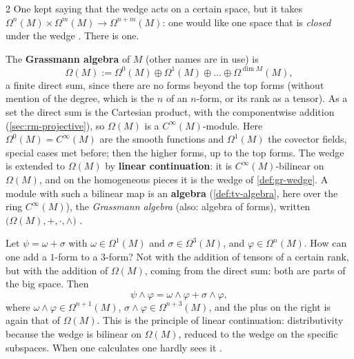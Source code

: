 \begin{paracol}{2}
One kept saying that the wedge acts on a certain space, but it takes $\Omega^n(M)\times\Omega^m(M)\to\Omega^{n+m}(M)$: one would like one space that is \emph{closed} under the wedge  . There is one.
\begin{definition}\label{def:gr-grassmann}
The \textbf{Grassmann algebra} of $M$ (other names are in use) is
\[
  \Omega(M):=\Omega^0(M)\oplus\Omega^1(M)\oplus\dots\oplus\Omega^{\dim M}(M),
\]
a finite direct sum, since there are no forms beyond the top forms (without mention of the degree, which is the $n$ of an $n$-form, or its rank as a tensor). As a set the direct sum is the Cartesian product, with the componentwise addition (\cref{sec:rm-projective}), so $\Omega(M)$ is a $C^\infty(M)$-module. Here $\Omega^0(M)=C^\infty(M)$ are the
smooth functions and $\Omega^1(M)$ the covector fields, special cases met before; then the higher forms, up to the top forms. The wedge is extended to $\Omega(M)$ by \textbf{linear continuation}: it is $C^\infty(M)$-bilinear on $\Omega(M)$, and on the homogeneous pieces it is the wedge of \cref{def:gr-wedge}. A module with such a bilinear map is an \textbf{algebra} (\cref{def:tv-algebra},
here over the ring $C^\infty(M)$), the \emph{Grassmann algebra} (also: algebra of forms), written $\bigl(\Omega(M),+,\cdot,\wedge\bigr)$              .
\end{definition}
\begin{example}\label{ex:gr-linear-cont}
Let $\psi=\omega+\sigma$ with $\omega\in\Omega^1(M)$ and $\sigma\in\Omega^3(M)$, and $\varphi\in\Omega^n(M)$. How can one add a $1$-form to a $3$-form? Not with the addition of tensors of a certain rank, but with the addition of $\Omega(M)$, coming from the direct sum: both are parts of the big space. Then
\[
  \psi\wedge\varphi=\omega\wedge\varphi+\sigma\wedge\varphi,
\]
where $\omega\wedge\varphi\in\Omega^{n+1}(M)$, $\sigma\wedge\varphi\in\Omega^{n+3}(M)$, and the plus on the right is again that of $\Omega(M)$. This is the principle of linear continuation: distributivity because the wedge is bilinear on $\Omega(M)$, reduced to the wedge on the specific subspaces. When one calculates one hardly sees it
          .

\end{example}
\end{paracol}
